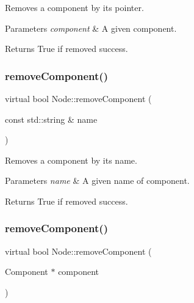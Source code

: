 Removes a component by its pointer.


\begin{DoxyParams}{Parameters}
{\em component} & A given component. \\
\hline
\end{DoxyParams}
\begin{DoxyReturn}{Returns}
True if removed success. 
\end{DoxyReturn}
\mbox{\label{classNode_a79887a0cfaa3705f0478c14044f93eea}} 
\subsubsection{\texorpdfstring{remove\+Component()}{removeComponent()}\hspace{0.1cm}{\footnotesize\ttfamily [3/4]}}
{\footnotesize\ttfamily virtual bool Node\+::remove\+Component (\begin{DoxyParamCaption}\item[{const std\+::string \&}]{name }\end{DoxyParamCaption})\hspace{0.3cm}{\ttfamily [virtual]}}

Removes a component by its name.


\begin{DoxyParams}{Parameters}
{\em name} & A given name of component. \\
\hline
\end{DoxyParams}
\begin{DoxyReturn}{Returns}
True if removed success. 
\end{DoxyReturn}
\mbox{\label{classNode_a4b9ccb90f2206b1d9b8ccf7b96a361f5}} 
\subsubsection{\texorpdfstring{remove\+Component()}{removeComponent()}\hspace{0.1cm}{\footnotesize\ttfamily [4/4]}}
{\footnotesize\ttfamily virtual bool Node\+::remove\+Component (\begin{DoxyParamCaption}\item[{Component $\ast$}]{component }\end{DoxyParamCaption})\hspace{0.3cm}{\ttfamily [virtual]}}

